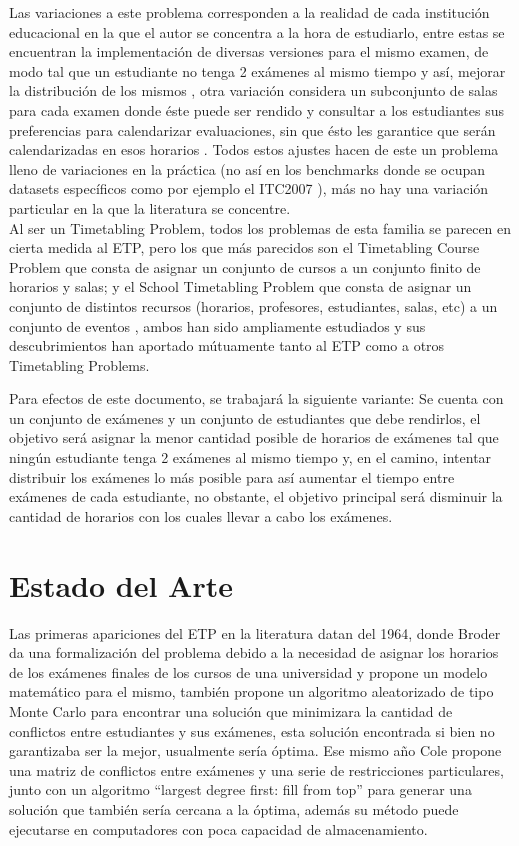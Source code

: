 \documentclass[letter, 10pt]{article}
\begin{document}
Las variaciones a este problema corresponden a la realidad de cada institución educacional en la que el autor se concentra a la hora de estudiarlo, entre estas se encuentran la implementación de diversas versiones para el mismo examen, de modo tal que un estudiante no tenga 2 exámenes al mismo tiempo y así, mejorar la distribución de los mismos \cite{WOUMANS2016178}, otra variación considera un subconjunto de salas para cada examen donde éste puede ser rendido y consultar a los estudiantes sus preferencias para calendarizar evaluaciones, sin que ésto les garantice que serán calendarizadas en esos horarios \cite{LAPORTE1984351}. Todos estos ajustes hacen de este un problema lleno de variaciones en la práctica (no así en los benchmarks donde se ocupan datasets específicos como por ejemplo el ITC2007 \cite{ITC2007}), más no hay una variación particular en la que la literatura se concentre.\\

Al ser un Timetabling Problem, todos los problemas de esta familia se parecen en cierta medida al ETP, pero los que más parecidos son el Timetabling Course Problem que consta de asignar un conjunto de cursos a un conjunto finito de horarios y salas; y el School Timetabling Problem que consta de asignar un conjunto de distintos recursos (horarios, profesores, estudiantes, salas, etc) a un conjunto de eventos \cite{TAN2021113943}, ambos han sido ampliamente estudiados y sus descubrimientos han aportado mútuamente tanto al ETP como a otros Timetabling Problems.

Para efectos de este documento, se trabajará la siguiente variante: Se cuenta con un conjunto de exámenes y un conjunto de estudiantes que debe rendirlos, el objetivo será asignar la menor cantidad posible de horarios de exámenes tal que ningún estudiante tenga 2 exámenes al mismo tiempo y, en el camino, intentar distribuir los exámenes lo más posible para así aumentar el tiempo entre exámenes de cada estudiante, no obstante, el objetivo principal será disminuir la cantidad de horarios con los cuales llevar a cabo los exámenes.

\section{Estado del Arte} \label{estado}

Las primeras apariciones del ETP en la literatura datan del 1964, donde Broder \cite{10.1145/355586.364824} da una formalización del problema debido a la necesidad de asignar los horarios de los exámenes finales de los cursos de una universidad y propone un modelo matemático para el mismo, también propone un algoritmo aleatorizado de tipo Monte Carlo para encontrar una solución que minimizara la cantidad de conflictos entre estudiantes y sus exámenes, esta solución encontrada si bien no garantizaba ser la mejor, usualmente sería óptima. Ese mismo año Cole \cite{10.1093/comjnl/7.2.117} propone una matriz de conflictos entre exámenes y una serie de restricciones particulares, junto con un algoritmo ``largest degree first: fill from top'' para generar una solución que también sería cercana a la óptima, además su método puede ejecutarse en computadores con poca capacidad de almacenamiento.\\ 
\end{document}
